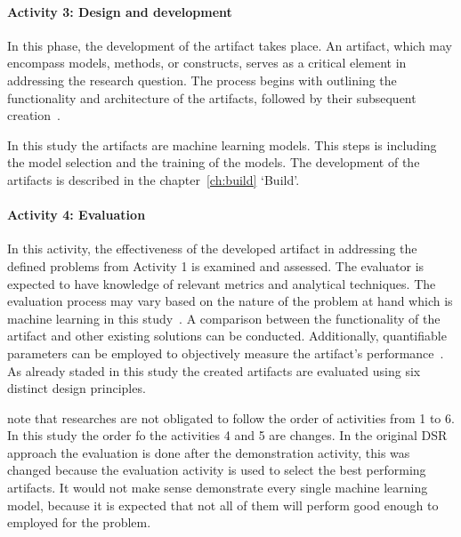 \paragraph{Activity 3: Design and development}
In this phase, the development of the artifact takes place.
An artifact, which may encompass models, methods, or constructs, serves as a critical element in addressing the
research question.
The process begins with outlining the functionality and architecture of the artifacts, followed by their subsequent
creation~\cite[p. 55]{peffers_designscienceresearch_2007}.

In this study the artifacts are machine learning models.
This steps is including the model selection and the training of the models.
The development of the artifacts is described in the chapter~\ref{ch:build} `Build'.

\paragraph{Activity 4: Evaluation}
In this activity, the effectiveness of the developed artifact in addressing the defined problems from Activity 1 is
examined and assessed.
The evaluator is expected to have knowledge of relevant metrics and analytical techniques.
The evaluation process may vary based on the nature of the problem at hand which is machine learning in this
study~\cite[p. 56]{peffers_designscienceresearch_2007}.
A comparison between the functionality of the artifact and other existing solutions can be conducted.
Additionally, quantifiable parameters can be employed to objectively measure the artifact's
performance~\cite[p. 56]{peffers_designscienceresearch_2007}.
As already staded in this study the created artifacts are evaluated using six distinct design principles.


\cite{peffers_designscienceresearch_2007} note  that researches are not obligated to follow the order of activities
from 1 to 6.
In this study the order fo the activities 4 and 5 are changes.
In the original DSR approach the evaluation is done after the demonstration activity, this was changed because the
evaluation activity is used to select the best performing artifacts.
It would not make sense demonstrate every single machine learning model, because it is expected that not all of them
will perform good enough to employed for the problem.


